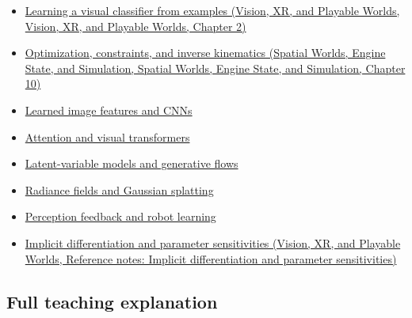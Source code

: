 \begin{itemize}
\tightlist
\item
  \href{../07-Vision-XR-and-Playable-Worlds/main.pdf\#nameddest=04-visual-computing-ii-ch031-learning-a-visual-classifier-from-examples}{Learning a visual classifier from examples (Vision, XR, and Playable Worlds, Vision, XR, and Playable Worlds, Chapter 2)}
\item
  \href{../05-Spatial-Worlds-Engine-State-and-Simulation/main.pdf\#nameddest=04-visual-computing-ii-ch029-optimization-constraints-and-inverse-kinematics}{Optimization, constraints, and inverse kinematics (Spatial Worlds, Engine State, and Simulation, Spatial Worlds, Engine State, and Simulation, Chapter 10)}
\item
  \hyperref[appendix-47c51ea026fb]{Learned image features and CNNs}
\item
  \hyperref[appendix-a9d5dfdd164a]{Attention and visual transformers}
\item
  \hyperref[appendix-2c568f05ee34]{Latent-variable models and generative flows}
\item
  \hyperref[appendix-c5b332e400e7]{Radiance fields and Gaussian splatting}
\item
  \hyperref[appendix-b0c42da325f1]{Perception feedback and robot learning}
\item
  \href{../07-Vision-XR-and-Playable-Worlds/main.pdf\#nameddest=appendix-8836553d56fc}{Implicit differentiation and parameter sensitivities (Vision, XR, and Playable Worlds, Reference notes: Implicit differentiation and parameter sensitivities)}
\end{itemize}

\subsection{Full teaching explanation}\label{appendix-40df0855b4a7-full-teaching-explanation}


